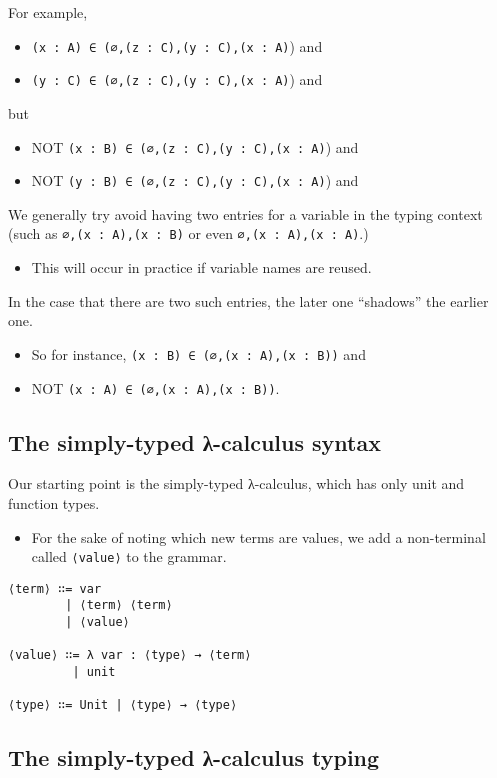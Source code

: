 \documentclass[11pt]{article}
\theoremstyle{definition}
\begin{document}
For example,
\begin{itemize}
\item \texttt{(x : A) ∈ (∅,(z : C),(y : C),(x : A)}) and
\item \texttt{(y : C) ∈ (∅,(z : C),(y : C),(x : A)}) and
\end{itemize}
but
\begin{itemize}
\item NOT \texttt{(x : B) ∈ (∅,(z : C),(y : C),(x : A)}) and
\item NOT \texttt{(y : B) ∈ (∅,(z : C),(y : C),(x : A)}) and
\end{itemize}

We generally try avoid having two entries for a variable in the typing context
(such as \texttt{∅,(x : A),(x : B)} or even \texttt{∅,(x : A),(x : A)}.)
\begin{itemize}
\item This will occur in practice if variable names are reused.
\end{itemize}
In the case that there are two such entries, the later one
“shadows” the earlier one.
\begin{itemize}
\item So for instance, \texttt{(x : B) ∈ (∅,(x : A),(x : B))} and
\item NOT \texttt{(x : A) ∈ (∅,(x : A),(x : B))}.
\end{itemize}

\subsection{The simply-typed λ-calculus syntax}
\label{sec:org7e930fd}

Our starting point is the simply-typed λ-calculus,
which has only unit and function types.
\begin{itemize}
\item For the sake of noting which new terms are values,
we add a non-terminal called \texttt{⟨value⟩} to the grammar.
\end{itemize}
\begin{verbatim}
⟨term⟩ ∷= var
        | ⟨term⟩ ⟨term⟩
        | ⟨value⟩
        
⟨value⟩ ∷= λ var : ⟨type⟩ → ⟨term⟩
         | unit
         
⟨type⟩ ∷= Unit | ⟨type⟩ → ⟨type⟩
\end{verbatim}

\subsection{The simply-typed λ-calculus typing}
\label{sec:org342c376}
\end{document}
